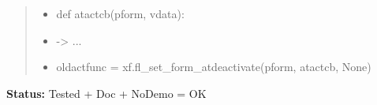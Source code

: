 \begin{boxedminipage}{\funcwidth}
\begin{quote}
\begin{itemize}
  \item
    \setlength{\parskip}{0.6ex}
def atactcb(pform, vdata):



  \item {\textbar}-{\textgreater}{\textbar} ...



  \item oldactfunc = xf.fl\_set\_form\_atdeactivate(pform, atactcb, None)



\end{itemize}

\end{quote}

\textbf{Status:} Tested + Doc + NoDemo = OK



    \end{boxedminipage}

    \label{xformslib:flbasic:fl_set_form_atdeactivate}

    \vspace{0.5ex}

